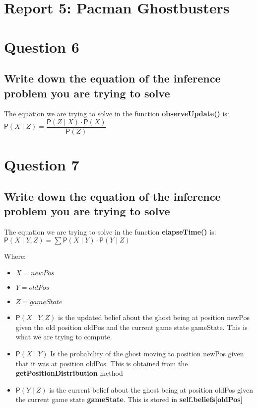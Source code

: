 \documentclass[11pt]{article}
\newcommand*{\prob}[1]{\ensuremath{\mathsf{P}(#1)}}
\begin{document}
\section*{Report 5: Pacman Ghostbusters}

\section*{Question 6}
\subsection*{Write down the equation of the inference problem you are trying to solve}
The equation we are trying to solve in the function \textbf{observeUpdate()} is:\\
    $ \prob{X \mid Z} = \dfrac{\prob{Z \mid X} \cdot \prob{X}}{\prob{Z}} $

\section*{Question 7}
\subsection*{Write down the equation of the inference problem you are trying to solve}
The equation we are trying to solve in the function \textbf{elapseTime()} is:\\

    $ \prob{X \mid Y, Z} = \sum \prob{X \mid Y} \cdot \prob{Y \mid Z} $

Where:\\
\begin{itemize}
\item $ X = newPos $
\item $ Y = oldPos $
\item $ Z = gameState $
\item $ \prob{X \mid Y, Z} $ is the updated belief about the ghost being at position newPos given the old position oldPos and the current game state gameState. This is what we are trying to compute.
\item $ \prob{X \mid Y} $ Is the probability of the ghost moving to position newPos given that it was at position oldPos.
This is obtained from the \textbf{getPositionDistribution} method
\item $ \prob{Y \mid Z} $ is the current belief about the ghost being at position oldPos given the current game state \textbf{gameState}.
This is stored in \textbf{self.beliefs[oldPos]}
\end{itemize}
\end{document}
